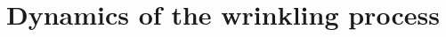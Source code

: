\documentclass[twocolumn,superscriptaddress,showpacs,preprintnumbers,
amsmath,amssymb,prl]{revtex4-1}
\begin{document}





\section*{Dynamics of the wrinkling process}
\end{document}
